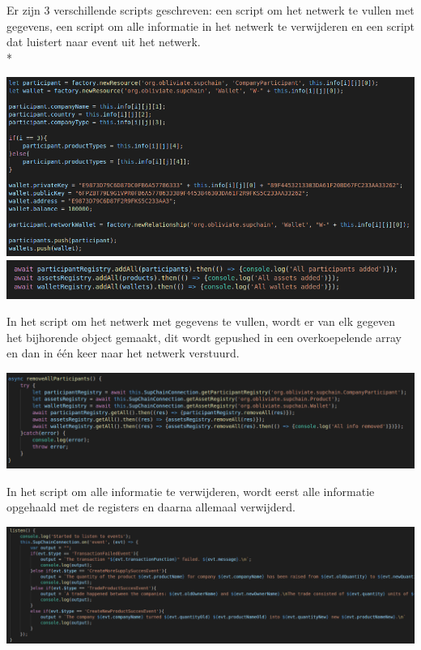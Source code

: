 \documentclass[fleqn,a4paper,12pt]{book}
\begin{document}
Er zijn 3 verschillende scripts geschreven: een script om het netwerk te vullen met gegevens, een script om alle informatie in het netwerk te verwijderen en een script dat luistert naar event uit het netwerk.\\*

\begin{center}
	\includegraphics[width=14cm]{img/create-create}\\[1cm]
	\includegraphics[width=14cm]{img/create-send}\\[1cm]
\end{center}

In het script om het netwerk met gegevens te vullen, wordt er van elk gegeven het bijhorende object gemaakt, dit wordt gepushed in een overkoepelende array en dan in één keer naar het netwerk verstuurd.

\begin{center}
	\includegraphics[width=14cm]{img/delete-delete}\\[1cm]
\end{center}

In het script om alle informatie te verwijderen, wordt eerst alle informatie opgehaald met de registers en daarna allemaal verwijderd.

\begin{center}
	\includegraphics[width=14cm]{img/listen-listen}\\[1cm]
\end{center}
\end{document}

